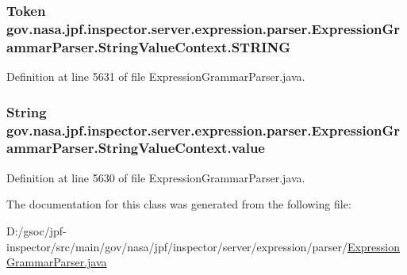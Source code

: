 \subsubsection[{\texorpdfstring{S\+T\+R\+I\+NG}{STRING}}]{\setlength{\rightskip}{0pt plus 5cm}Token gov.\+nasa.\+jpf.\+inspector.\+server.\+expression.\+parser.\+Expression\+Grammar\+Parser.\+String\+Value\+Context.\+S\+T\+R\+I\+NG}\hypertarget{classgov_1_1nasa_1_1jpf_1_1inspector_1_1server_1_1expression_1_1parser_1_1_expression_grammar_parser_1_1_string_value_context_acd1f9825f7c1c2d43b76f0d7107cd227}{}\label{classgov_1_1nasa_1_1jpf_1_1inspector_1_1server_1_1expression_1_1parser_1_1_expression_grammar_parser_1_1_string_value_context_acd1f9825f7c1c2d43b76f0d7107cd227}


Definition at line 5631 of file Expression\+Grammar\+Parser.\+java.

\subsubsection[{\texorpdfstring{value}{value}}]{\setlength{\rightskip}{0pt plus 5cm}String gov.\+nasa.\+jpf.\+inspector.\+server.\+expression.\+parser.\+Expression\+Grammar\+Parser.\+String\+Value\+Context.\+value}\hypertarget{classgov_1_1nasa_1_1jpf_1_1inspector_1_1server_1_1expression_1_1parser_1_1_expression_grammar_parser_1_1_string_value_context_a93662ead4acd48dd2e0dacddccb5f339}{}\label{classgov_1_1nasa_1_1jpf_1_1inspector_1_1server_1_1expression_1_1parser_1_1_expression_grammar_parser_1_1_string_value_context_a93662ead4acd48dd2e0dacddccb5f339}


Definition at line 5630 of file Expression\+Grammar\+Parser.\+java.



The documentation for this class was generated from the following file\+:\begin{DoxyCompactItemize}
\item 
D\+:/gsoc/jpf-\/inspector/src/main/gov/nasa/jpf/inspector/server/expression/parser/\hyperlink{_expression_grammar_parser_8java}{Expression\+Grammar\+Parser.\+java}\end{DoxyCompactItemize}

